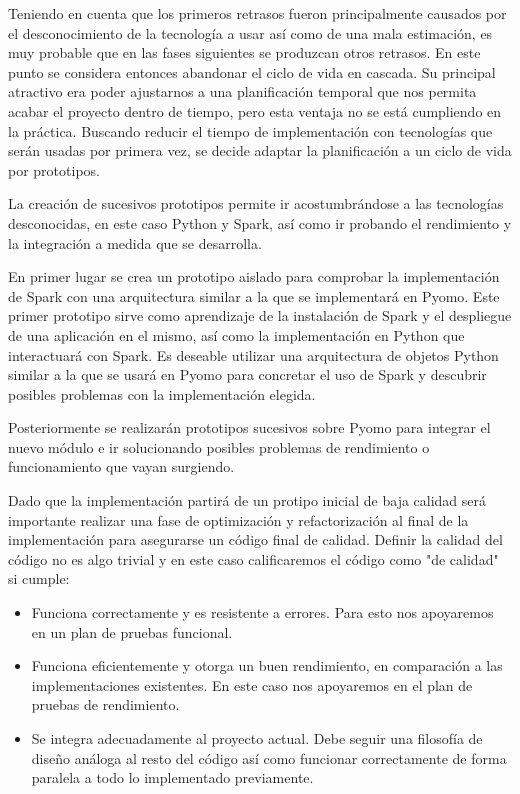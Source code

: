 Teniendo en cuenta que los primeros retrasos fueron principalmente causados por el desconocimiento de la tecnología a usar así como de una mala estimación, es muy probable que en las fases siguientes se produzcan otros retrasos. En este punto se considera entonces abandonar el ciclo de vida en cascada. Su principal atractivo era poder ajustarnos a una planificación temporal que nos permita acabar el proyecto dentro de tiempo, pero esta ventaja no se está cumpliendo en la práctica. Buscando reducir el tiempo de implementación con tecnologías que serán usadas por primera vez, se decide adaptar la planificación a un ciclo de vida por prototipos. 

La creación de sucesivos prototipos permite ir acostumbrándose a las tecnologías desconocidas, en este caso Python y Spark, así como ir probando el rendimiento y la integración a medida que se desarrolla.

En primer lugar se crea un prototipo aislado para comprobar la implementación de Spark con una arquitectura similar a la que se implementará en Pyomo. Este primer prototipo sirve como aprendizaje de la instalación de Spark y el despliegue de una aplicación en el mismo, así como la implementación en Python que interactuará con Spark. Es deseable utilizar una arquitectura de objetos Python similar a la que se usará en Pyomo para concretar el uso de Spark y descubrir posibles problemas con la implementación elegida.

Posteriormente se realizarán prototipos sucesivos sobre Pyomo para integrar el nuevo módulo e ir solucionando posibles problemas de rendimiento o funcionamiento que vayan surgiendo. 

Dado que la implementación partirá de un protipo inicial de baja calidad será importante realizar una fase de optimización y refactorización al final de la implementación para asegurarse un código final de calidad. Definir la calidad del código no es algo trivial y en este caso calificaremos el código como "de calidad" si cumple:

\begin{itemize}
    \item Funciona correctamente y es resistente a errores. Para esto nos apoyaremos en un plan de pruebas funcional.
    \item Funciona eficientemente y otorga un buen rendimiento, en comparación a las implementaciones existentes. En este caso nos apoyaremos en el plan de pruebas de rendimiento.
    \item Se integra adecuadamente al proyecto actual. Debe seguir una filosofía de diseño análoga al resto del código así como funcionar correctamente de forma paralela a todo lo implementado previamente.
\end{itemize}

